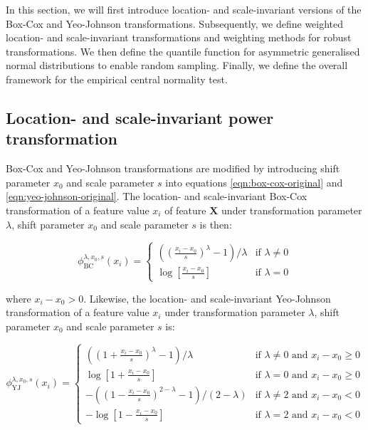 \documentclass[preprint,12pt,authoryear]{elsarticle}
\begin{document}
In this section, we will first introduce location- and scale-invariant
versions of the Box-Cox and Yeo-Johnson transformations. Subsequently,
we define weighted location- and scale-invariant transformations and
weighting methods for robust transformations. We then define the
quantile function for asymmetric generalised normal distributions to
enable random sampling. Finally, we define the overall framework for the
empirical central normality test.

\subsection{Location- and scale-invariant power
transformation}\label{location--and-scale-invariant-power-transformation}

Box-Cox and Yeo-Johnson transformations are modified by introducing
shift parameter \(x_0\) and scale parameter \(s\) into equations
\ref{eqn:box-cox-original} and \ref{eqn:yeo-johnson-original}. The
location- and scale-invariant Box-Cox transformation of a feature value
\(x_i\) of feature \(\mathbf{X}\) under transformation parameter
\(\lambda\), shift parameter \(x_0\) and scale parameter \(s\) is then:

\begin{equation}
\label{eqn:box-cox-invariant}
\phi_{\text{BC}}^{\lambda, x_0, s} (x_i) = 
\begin{cases}
\left( \left(\frac{x_i - x_0}{s} \right)^\lambda - 1 \right) / \lambda & \text{if } \lambda \neq 0\\
\log\left[\frac{x_i - x_0}{s}\right] & \text{if } \lambda = 0
\end{cases}
\end{equation}

where \(x_i - x_0 > 0\). Likewise, the location- and scale-invariant
Yeo-Johnson transformation of a feature value \(x_i\) under
transformation parameter \(\lambda\), shift parameter \(x_0\) and scale
parameter \(s\) is:

\begin{equation}
\label{eqn:yeo-johnson-invariant}
\phi_{\text{YJ}}^{\lambda, x_0, s} (x_i) = 
\begin{cases}
\left( \left( 1 + \frac{x_i - x_0}{s}\right)^\lambda - 1\right) / \lambda & \text{if } \lambda \neq 0 \text{ and } x_i - x_0 \geq 0\\
\log\left[1 + \frac{x_i - x_0}{s}\right] & \text{if } \lambda = 0 \text{ and } x_i - x_0 \geq 0\\
-\left( \left( 1 - \frac{x_i - x_0}{s}\right)^{2 - \lambda} - 1 \right) / \left(2 - \lambda \right) & \text{if } \lambda \neq 2 \text{ and } x_i - x_0 < 0\\
-\log\left[1 - \frac{x_i - x_0}{s}\right] & \text{if } \lambda = 2 \text{ and } x_i - x_0 < 0
\end{cases}
\end{equation}
\end{document}
